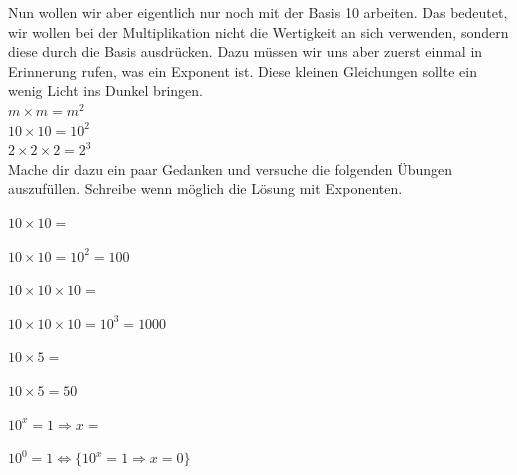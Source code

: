 Nun wollen wir aber eigentlich nur noch mit der Basis 10 arbeiten. Das bedeutet, wir wollen bei der Multiplikation nicht
die Wertigkeit an sich verwenden, sondern diese durch die Basis ausdrücken. Dazu müssen wir uns aber zuerst einmal in
Erinnerung rufen, was ein Exponent ist. Diese kleinen Gleichungen sollte ein wenig Licht ins Dunkel bringen.\\
$m \times m = m^2$\\
$10 \times 10 = 10^2$\\
$2 \times 2 \times 2 = 2^3$\\
\newpage
Mache dir dazu ein paar Gedanken und versuche die folgenden Übungen auszufüllen. Schreibe wenn möglich die Lösung
mit Exponenten.
\begin{exerciseseries}[columns=2,solsubrule=\hrule]{}
    \begin{exercise}
        $10 \times 10 = $\underline{\hspace{1cm}}
    \end{exercise}
    \begin{solution}
        $10 \times 10 = 10^2 = 100$
    \end{solution}

    \begin{exercise}
        $10 \times 10 \times 10 = $\underline{\hspace{1cm}}
    \end{exercise}
    \begin{solution}
        $10 \times 10 \times 10 = 10^3 = 1000$
    \end{solution}

    \begin{exercise}
        $10 \times 5 = $\underline{\hspace{1cm}}
    \end{exercise}
    \begin{solution}
        $10 \times 5 = 50$
    \end{solution}

    \begin{exercise}
        $10^x = 1 \Rightarrow x = $\underline{\hspace{1cm}}
    \end{exercise}
    \begin{solution}
        $10^0 = 1 \Leftrightarrow \{10^x = 1 \Rightarrow x = 0\}$
    \end{solution}
\end{exerciseseries}

